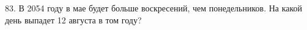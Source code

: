 83. В 2054 году в мае будет больше воскресений, чем понедельников. На какой день выпадет 12 августа в том году?\\
